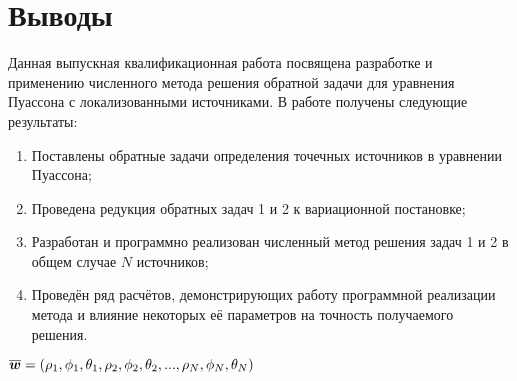 \section{Выводы}
Данная выпускная квалификационная работа посвящена разработке и применению численного метода решения обратной задачи для уравнения Пуассона с локализованными источниками. В работе получены следующие результаты:
\begin{enumerate}
    \item Поставлены обратные задачи определения точечных источников в уравнении Пуассона;
    \item Проведена редукция обратных задач 1 и 2 к вариационной постановке;
    \item Разработан и программно реализован численный метод решения задач 1 и 2 в общем случае $N$ источников;
    \item Проведён ряд расчётов, демонстрирующих работу программной реализации метода и влияние некоторых её параметров на точность получаемого решения.
\end{enumerate}

$\boldsymbol{\overline{w}}=(\rho_1,\phi_1,\theta_1,\rho_2,\phi_2,\theta_2,...,\rho_N,\phi_N,\theta_N)$
